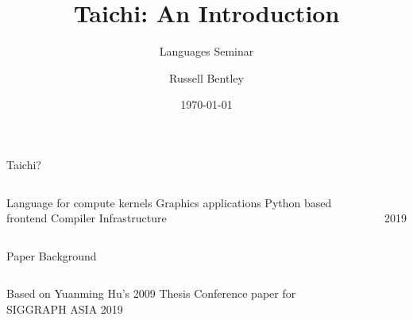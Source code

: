 \documentclass{beamer}[10pt]
\title{Taichi: An Introduction}
\subtitle{Languages Seminar}
\author{Russell Bentley}
\institute{Stony Brook}
\date{\today}
\begin{document}
\frame{\titlepage}

\begin{frame}{Taichi?}
\begin{columns}
\centering
\begin{outline}
  \1 Language for compute kernels
    \2 Graphics applications 
  \1 Python based frontend
  \1 Compiler Infrastructure
\end{outline}
\centering
{} 

\\
2019 \cite{Hu2019}

\end{columns}
\end{frame}

\begin{frame}{Paper Background}
\begin{columns}
\centering
\begin{outline}
    \1 Based on Yuanming Hu's 2009 Thesis
    \2 Conference paper for \\ SIGGRAPH ASIA 2019
\end{outline}
\centering
{}


\end{columns}

\end{frame}
\end{document}
